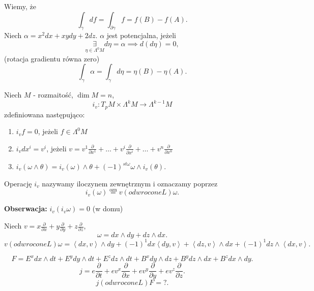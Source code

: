 \documentclass[../main.tex]{subfiles}
\begin{document}
Wiemy, że
\[
    \int_{\gamma}df = \int_{\partial\gamma}f = f(B) - f(A)
.\]
Niech $\alpha = x^2dx + xydy + 2dz$. $\alpha$ jest potencjalna, jeżeli
\[
    \underset{\eta\in \Lambda^0M}{\exists} d\eta = \alpha \implies d(d\eta) = 0
,\]
(rotacja gradientu równa zero)
\[
    \int_{\gamma}\alpha = \int_{\gamma}d\eta = \eta(B) - \eta(A)
.\]
\begin{definicja}
    Niech $M$ - rozmaitość, $\dim M = n$,\\
    \[
        i_v : T_pM \times \Lambda^kM\to \Lambda^{k-1}M
    \]
    zdefiniowana następująco:
    \begin{enumerate}
        \item $i_v f = 0$, jeżeli $f\in \Lambda^0M$
        \item  $i_v dx^i = v^i$, jeżeli $v = v^1 \frac{\partial }{\partial x^1} + \ldots + v^i \frac{\partial }{\partial x^i} + \ldots + v^n \frac{\partial }{\partial x^n} $
        \item $i_v(\omega\land \theta) = i_v(\omega)\land \theta + (-1)^{st \omega} \omega\land i_v(\theta)$.
    \end{enumerate}
    Operację $i_v$ nazywamy iloczynem zewnętrznym i oznaczamy poprzez
    \[
        i_v(\omega) \overset{\text{ozn}}{=} v (odwrocone L) \omega
    .\]
\end{definicja}
\textbf{Obserwacja:} $i_v(i_v\omega) = 0 $ (w domu)
\begin{przyklad}
    Niech $v = x \frac{\partial }{\partial x} + y \frac{\partial }{\partial y} + z \frac{\partial }{\partial z} $,
    \[
    \omega = dx\land dy + dz \land dx
    .\]
\[
    v (odwrocone L) \omega = \left<dx, v \right> \land dy + (-1)^1 dx\left<dy,v \right> + \left<dz, v \right>\land dx + (-1)^1 dz\land \left<dx, v \right>
.\]
\end{przyklad}
\begin{przyklad}
    \[
     F = E^xdx\land dt + E^ydy\land dt + E^z dz\land dt + B^x dy\land dz + B^ydz\land dx + B^zdx\land dy
    .\]
\[
j = e \frac{\partial }{\partial t} + ev^x \frac{\partial }{\partial x}  + ev^y \frac{\partial }{\partial y} + ev^z \frac{\partial }{\partial z}
.\]
\[
    j (odwrocone L) F = ?
.\]
\end{przyklad}
\end{document}
